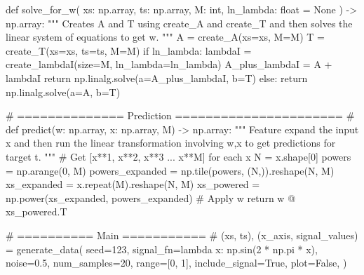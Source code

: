 \documentclass[
  0.875em,
  letterpaper,
  DIV=11,
  numbers=noendperiod]{scrartcl}
\newenvironment{Shaded}{\begin{snugshade}}{\end{snugshade}}
\newcommand{\BuiltInTok}[1]{\textcolor[rgb]{0.00,0.23,0.31}{#1}}
\newcommand{\CommentTok}[1]{\textcolor[rgb]{0.37,0.37,0.37}{#1}}
\newcommand{\ControlFlowTok}[1]{\textcolor[rgb]{0.00,0.23,0.31}{#1}}
\newcommand{\DecValTok}[1]{\textcolor[rgb]{0.68,0.00,0.00}{#1}}
\newcommand{\FloatTok}[1]{\textcolor[rgb]{0.68,0.00,0.00}{#1}}
\newcommand{\KeywordTok}[1]{\textcolor[rgb]{0.00,0.23,0.31}{#1}}
\newcommand{\NormalTok}[1]{\textcolor[rgb]{0.00,0.23,0.31}{#1}}
\newcommand{\OperatorTok}[1]{\textcolor[rgb]{0.37,0.37,0.37}{#1}}
\newcommand{\VariableTok}[1]{\textcolor[rgb]{0.07,0.07,0.07}{#1}}
\begin{document}
\begin{Shaded}
\begin{Highlighting}[]
\KeywordTok{def}\NormalTok{ solve\_for\_w(}
\NormalTok{    xs: np.array, ts: np.array, M: }\BuiltInTok{int}\NormalTok{, ln\_lambda: }\BuiltInTok{float} \OperatorTok{=} \VariableTok{None}
\NormalTok{) }\OperatorTok{{-}\textgreater{}}\NormalTok{ np.array:}
    \CommentTok{"""}
\CommentTok{    Creates A and T using \textasciigrave{}create\_A\textasciigrave{} and \textasciigrave{}create\_T\textasciigrave{} and then solves}
\CommentTok{    the linear system of equations to get w.}
\CommentTok{    """}
\NormalTok{    A }\OperatorTok{=}\NormalTok{ create\_A(xs}\OperatorTok{=}\NormalTok{xs, M}\OperatorTok{=}\NormalTok{M)}
\NormalTok{    T }\OperatorTok{=}\NormalTok{ create\_T(xs}\OperatorTok{=}\NormalTok{xs, ts}\OperatorTok{=}\NormalTok{ts, M}\OperatorTok{=}\NormalTok{M)}
    \ControlFlowTok{if}\NormalTok{ ln\_lambda:}
\NormalTok{        lambdaI }\OperatorTok{=}\NormalTok{ create\_lambdaI(size}\OperatorTok{=}\NormalTok{M, ln\_lambda}\OperatorTok{=}\NormalTok{ln\_lambda)}
\NormalTok{        A\_plus\_lambdaI }\OperatorTok{=}\NormalTok{ A }\OperatorTok{+}\NormalTok{ lambdaI}
        \ControlFlowTok{return}\NormalTok{ np.linalg.solve(a}\OperatorTok{=}\NormalTok{A\_plus\_lambdaI, b}\OperatorTok{=}\NormalTok{T)}
    \ControlFlowTok{else}\NormalTok{:}
        \ControlFlowTok{return}\NormalTok{ np.linalg.solve(a}\OperatorTok{=}\NormalTok{A, b}\OperatorTok{=}\NormalTok{T)}

\CommentTok{\# ============== Prediction ====================== \#}
\KeywordTok{def}\NormalTok{ predict(w: np.array, x: np.array, M) }\OperatorTok{{-}\textgreater{}}\NormalTok{ np.array:}
    \CommentTok{"""}
\CommentTok{    Feature expand the input x and then run the linear}
\CommentTok{    transformation involving w,x to get predictions for target t.}
\CommentTok{    """}
    \CommentTok{\# Get [x**1, x**2, x**3 ... x**M] for each x}
\NormalTok{    N }\OperatorTok{=}\NormalTok{ x.shape[}\DecValTok{0}\NormalTok{]}
\NormalTok{    powers }\OperatorTok{=}\NormalTok{ np.arange(}\DecValTok{0}\NormalTok{, M)}
\NormalTok{    powers\_expanded }\OperatorTok{=}\NormalTok{ np.tile(powers, (N,)).reshape(N, M)}
\NormalTok{    xs\_expanded }\OperatorTok{=}\NormalTok{ x.repeat(M).reshape(N, M)}
\NormalTok{    xs\_powered }\OperatorTok{=}\NormalTok{ np.power(xs\_expanded, powers\_expanded)}
    \CommentTok{\# Apply w}
    \ControlFlowTok{return}\NormalTok{ w }\OperatorTok{@}\NormalTok{ xs\_powered.T}

\CommentTok{\# ========== Main =========== \#}
\NormalTok{(xs, ts), (x\_axis, signal\_values) }\OperatorTok{=}\NormalTok{ generate\_data(}
\NormalTok{    seed}\OperatorTok{=}\DecValTok{123}\NormalTok{,}
\NormalTok{    signal\_fn}\OperatorTok{=}\KeywordTok{lambda}\NormalTok{ x: np.sin(}\DecValTok{2} \OperatorTok{*}\NormalTok{ np.pi }\OperatorTok{*}\NormalTok{ x),}
\NormalTok{    noise}\OperatorTok{=}\FloatTok{0.5}\NormalTok{,}
\NormalTok{    num\_samples}\OperatorTok{=}\DecValTok{20}\NormalTok{,}
    \BuiltInTok{range}\OperatorTok{=}\NormalTok{[}\DecValTok{0}\NormalTok{, }\DecValTok{1}\NormalTok{],}
\NormalTok{    include\_signal}\OperatorTok{=}\VariableTok{True}\NormalTok{,}
\NormalTok{    plot}\OperatorTok{=}\VariableTok{False}\NormalTok{,}
\NormalTok{)}


\end{Highlighting}
\end{Shaded}
\end{document}
